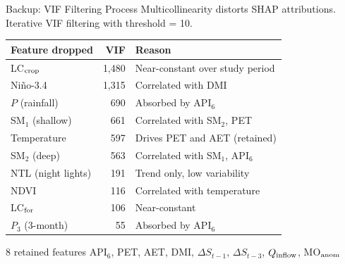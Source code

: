 \documentclass[10pt]{beamer}
\begin{document}
\begin{frame}{Backup: VIF Filtering Process}
  \footnotesize
  Multicollinearity distorts SHAP attributions.
  Iterative VIF filtering with threshold = 10.

  \smallskip
  {\scriptsize
  \begin{tabular}{@{}L{2.2cm}rL{5.0cm}@{}}
    \toprule
    \textbf{Feature dropped} & \textbf{VIF} & \textbf{Reason} \\
    \midrule
    LC$_{\rm crop}$   & 1,480 & Near-constant over study period \\
    Ni\~{n}o-3.4      & 1,315 & Correlated with DMI \\
    $P$ (rainfall)    & 690   & Absorbed by API$_6$ \\
    SM$_1$ (shallow)  & 661   & Correlated with SM$_2$, PET \\
    Temperature       & 597   & Drives PET and AET (retained) \\
    SM$_2$ (deep)     & 563   & Correlated with SM$_1$, API$_6$ \\
    NTL (night lights) & 191  & Trend only, low variability \\
    NDVI              & 116   & Correlated with temperature \\
    LC$_{\rm for}$    & 106   & Near-constant \\
    $P_3$ (3-month)   & 55    & Absorbed by API$_6$ \\
    \bottomrule
  \end{tabular}}

  \smallskip
  \begin{block}{\footnotesize 8 retained features}
    \scriptsize
    API$_6$, PET, AET, DMI,
    $\Delta S_{t-1}$, $\Delta S_{t-3}$,
    $Q_{\rm inflow}$, MO$_{\rm anom}$
  \end{block}
\end{frame}
\end{document}
